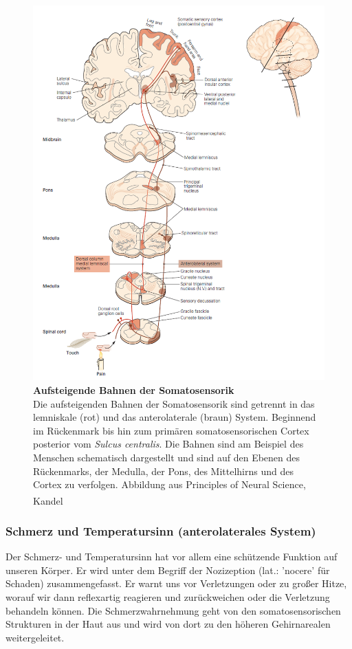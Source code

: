 \documentclass[12pt,a4paper,pdftex]{article}
\begin{document}
\begin{figure}[H]
    \centering
    \includegraphics{pictures/somatosensory/pathway_somatosensory2.png}
    \caption[Aufsteigende Bahnen der Somatosensorik]{\textbf{Aufsteigende Bahnen der Somatosensorik}\\
    Die aufsteigenden Bahnen der Somatosensorik sind getrennt in das lemniskale (rot) und das anterolaterale (braun) System. Beginnend im Rückenmark bis hin zum primären somatosensorischen Cortex posterior vom \textit{Sulcus centralis}. Die Bahnen sind am Beispiel des Menschen schematisch dargestellt und sind auf den Ebenen des Rückenmarks, der Medulla, der Pons, des Mittelhirns und des Cortex zu verfolgen.
    Abbildung aus Principles of Neural Science, Kandel \textsuperscript{\cite[22]{kandel2013principles}}}
    \label{fig:somato_pathway}
\end{figure}

\newpage    
\subsubsection{Schmerz und Temperatursinn (anterolaterales System)}
\label{subsubsec:Schmerzsinn}
Der Schmerz- und Temperatursinn   hat vor allem eine schützende Funktion auf unseren Körper. Er wird unter dem Begriff der Nozizeption (lat.: 'nocere' für Schaden) zusammengefasst. Er warnt uns vor Verletzungen oder zu großer Hitze, worauf wir dann reflexartig reagieren und zurückweichen oder die Verletzung behandeln können. Die Schmerzwahrnehmung geht von den somatosensorischen Strukturen in der Haut aus und wird von dort zu den höheren Gehirnarealen weitergeleitet.
\end{document}
